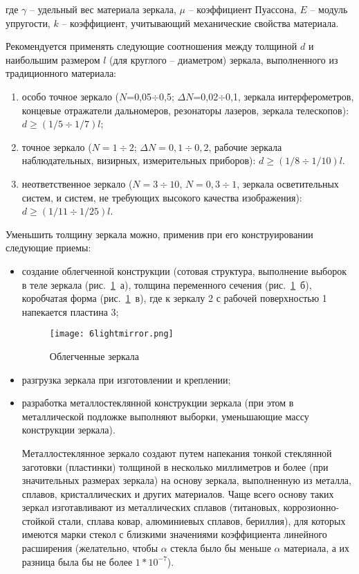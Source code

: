 \begin{enumerate}[leftmargin=*]
где $ \gamma $ -- удельный вес материала зеркала, $ \mu $ -- коэффициент Пуассона, $ E $ -- модуль упругости, $ k  $ -- коэффициент, учитывающий механические свойства материала.

Рекомендуется применять следующие соотношения между толщиной $ d $ и наибольшим размером $ l $ (для круглого -- диаметром) зеркала, выполненного из традиционного материала:

\begin{enumerate}
\item особо точное зеркало ($ N $=0,05$ \div $0,5;  $ \Delta N $=0,02$ \div $0,1, зеркала интерферометров, концевые отражатели дальномеров, резонаторы лазеров, зеркала телескопов): $ d \ge (1/5 \div 1/7)l $;
\item точное зеркало ($ N=1\div2 $;  $ \Delta N=0,1\div0,2 $, рабочие зеркала наблюдательных, визирных, измерительных приборов): $ d \ge (1/8 \div 1/10)l $.
\item неответственное зеркало ($ N=3 \div 10 $,  $ N=0,3 \div 1 $, зеркала осветительных систем, и систем, не требующих высокого качества изображения): $ d \ge (1/11 \div 1/25)l $.
\end{enumerate}

Уменьшить толщину зеркала можно, применив при его конструировании следующие приемы:

\begin{itemize}
\item создание облегченной конструкции (сотовая структура, выполнение выборок в теле зеркала (рис.~\ref{pic:6lightmirror}~а), толщина переменного сечения (рис.~\ref{pic:6lightmirror}~б), коробчатая форма (рис.~\ref{pic:6lightmirror}~в), где к зеркалу 2 с рабочей поверхностью 1 напекается пластина 3;

\begin{figure}[h!]
	\caption{ Облегченные зеркала }
	\texttt{[image: 6lightmirror.png]}
	\label{pic:6lightmirror}
\end{figure}

\item разгрузка зеркала при изготовлении и креплении;
\item разработка металлостеклянной конструкции зеркала (при этом в металлической подложке выполняют выборки, уменьшающие массу конструкции зеркала).

Металлостеклянное зеркало создают путем напекания тонкой стеклянной заготовки (пластинки) толщиной в несколько миллиметров и более (при значительных размерах зеркала) на основу зеркала, выполненную из металла, сплавов, кристаллических и других материалов. Чаще всего основу таких зеркал изготавливают из металлических сплавов (титановых, коррозионно-стойкой стали, сплава ковар, алюминиевых сплавов, бериллия), для которых имеются марки стекол с близкими значениями коэффициента линейного расширения (желательно, чтобы $ \alpha $ стекла было бы меньше  $ \alpha $ материала, а их разница была бы не более $1*10^{-7} $).


\end{itemize}
\end{enumerate}
